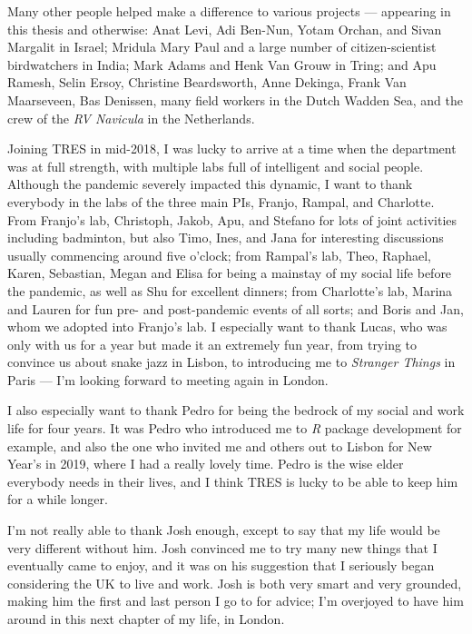Many other people helped make a difference to various projects --- appearing in this thesis and otherwise: Anat Levi, Adi Ben-Nun, Yotam Orchan, and Sivan Margalit in Israel; Mridula Mary Paul and a large number of citizen-scientist birdwatchers in India; Mark Adams and Henk Van Grouw in Tring; and Apu Ramesh, Selin Ersoy, Christine Beardsworth, Anne Dekinga, Frank Van Maarseveen, Bas Denissen, many field workers in the Dutch Wadden Sea, and the crew of the \textit{RV Navicula} in the Netherlands.

\medskip

Joining TRES in mid-2018, I was lucky to arrive at a time when the department was at full strength, with multiple labs full of intelligent and social people.
Although the pandemic severely impacted this dynamic, I want to thank everybody in the labs of the three main PIs, Franjo, Rampal, and Charlotte.
From Franjo's lab, Christoph, Jakob, Apu, and Stefano for lots of joint activities including badminton, but also Timo, Ines, and Jana for interesting discussions usually commencing around five o'clock;
from Rampal's lab, Theo, Raphael, Karen, Sebastian, Megan and Elisa for being a mainstay of my social life before the pandemic, as well as Shu for excellent dinners;
from Charlotte's lab, Marina and Lauren for fun pre- and post-pandemic events of all sorts;
and Boris and Jan, whom we adopted into Franjo's lab.
I especially want to thank Lucas, who was only with us for a year but made it an extremely fun year, from trying to convince us about snake jazz in Lisbon, to introducing me to \textit{Stranger Things} in Paris --- I'm looking forward to meeting again in London.

I also especially want to thank Pedro for being the bedrock of my social and work life for four years.
It was Pedro who introduced me to \textit{R} package development for example, and also the one who invited me and others out to Lisbon for New Year's in 2019, where I had a really lovely time.
Pedro is the wise elder everybody needs in their lives, and I think TRES is lucky to be able to keep him for a while longer.

I'm not really able to thank Josh enough, except to say that my life would be very different without him.
Josh convinced me to try many new things that I eventually came to enjoy, and it was on his suggestion that I seriously began considering the UK to live and work.
Josh is both very smart and very grounded, making him the first and last person I go to for advice; I'm overjoyed to have him around in this next chapter of my life, in London.

